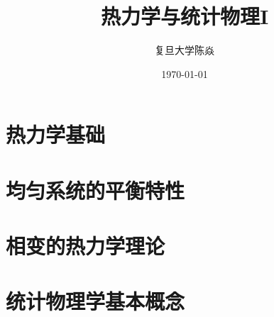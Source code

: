 \documentclass{book}
\title{
	\vspace{-4 cm}
	\bfseries
	热力学与统计物理I
}
\author{
	\CJKfamily{楷体}
	复旦大学\phantom{空格}陈焱
}
\date{
	\CJKfamily{楷体}
	\today
}
\numberwithin{equation}{section}
\theoremstyle{empty} %
\theoremstyle{empty} %
\theoremstyle{plain} %
\let \oldInclude = 
\renewcommand{}[1]{{\let \clearpage = \relax \oldInclude{#1}}}
\begin{document}
%	
%			
%			
%			
%			
%			
		\chapter{热力学基础}
			
			
		\chapter{均匀系统的平衡特性}
			
			
		\chapter{相变的热力学理论}
			
			
%			
%			
		\chapter{统计物理学基本概念}
			
%		
%			
%		
%			
%		
%			
		
\end{document}
